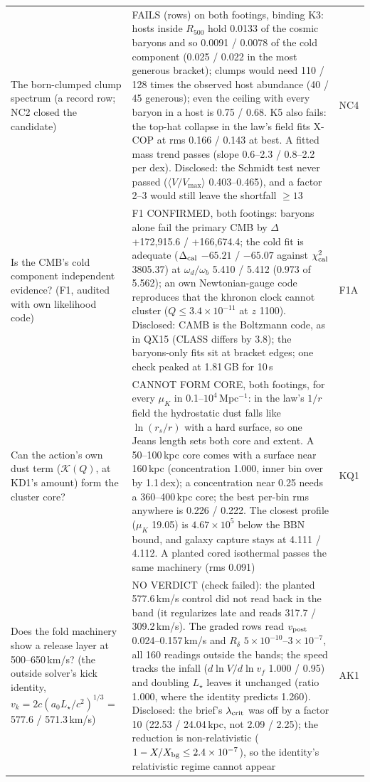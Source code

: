 \documentclass[10pt]{article}
\begin{document}
\begin{longtable}{@{}p{4.4cm}p{8.6cm}p{2.8cm}@{}}
The born-clumped clump spectrum (a record row; NC2 closed the candidate) & FAILS (rows) on both footings, binding K3: hosts inside $R_{500}$ hold 0.0133 of the cosmic baryons and so 0.0091 / 0.0078 of the cold component (0.025 / 0.022 in the most generous bracket); clumps would need 110 / 128 times the observed host abundance (40 / 45 generous); even the ceiling with every baryon in a host is 0.75 / 0.68. K5 also fails: the top-hat collapse in the law's field fits X-COP at rms 0.166 / 0.143 at best. A fitted mass trend passes (slope 0.6--2.3 / 0.8--2.2 per dex). Disclosed: the Schmidt test never passed ($\langle V/V_{\max}\rangle$ 0.403--0.465), and a factor 2--3 would still leave the shortfall $\ge13$ & NC4\\
Is the CMB's cold component independent evidence? (F1, audited with own likelihood code) & F1 CONFIRMED, both footings: baryons alone fail the primary CMB by $\Delta$ +172,915.6 / +166,674.4; the cold fit is adequate ($\Delta_{\rm cal}$ $-65.21$ / $-65.07$ against $\chi^2_{\rm cal}$ 3805.37) at $\omega_d/\omega_b$ 5.410 / 5.412 (0.973 of 5.562); an own Newtonian-gauge code reproduces that the khronon clock cannot cluster ($Q\le3.4\times10^{-11}$ at $z$ 1100). Disclosed: CAMB is the Boltzmann code, as in QX15 (CLASS differs by 3.8); the baryons-only fits sit at bracket edges; one check peaked at 1.81\,GB for 10\,s & F1A\\
Can the action's own dust term ($\mathcal K(Q)$, at KD1's amount) form the cluster core? & CANNOT FORM CORE, both footings, for every $\mu_K$ in 0.1--$10^4$\,Mpc$^{-1}$: in the law's $1/r$ field the hydrostatic dust falls like $\ln(r_s/r)$ with a hard surface, so one Jeans length sets both core and extent. A 50--100\,kpc core comes with a surface near 160\,kpc (concentration 1.000, inner bin over by 1.1\,dex); a concentration near 0.25 needs a 360--400\,kpc core; the best per-bin rms anywhere is 0.226 / 0.222. The closest profile ($\mu_K$ 19.05) is $4.67\times10^5$ below the BBN bound, and galaxy capture stays at 4.111 / 4.112. A planted cored isothermal passes the same machinery (rms 0.091) & KQ1\\
Does the fold machinery show a release layer at 500--650\,km/s? (the outside solver's kick identity, $v_k=2c(a_0L_\star/c^2)^{1/3}$ = 577.6 / 571.3\,km/s) & NO VERDICT (check failed): the planted 577.6\,km/s control did not read back in the band (it regularizes late and reads 317.7 / 309.2\,km/s). The graded rows read $v_{\rm post}$ 0.024--0.157\,km/s and $R_\delta$ $5\times10^{-10}$--$3\times10^{-7}$, all 160 readings outside the bands; the speed tracks the infall ($d\ln V/d\ln v_f$ 1.000 / 0.95) and doubling $L_\star$ leaves it unchanged (ratio 1.000, where the identity predicts 1.260). Disclosed: the brief's $\lambda_{\rm crit}$ was off by a factor 10 (22.53 / 24.04\,kpc, not 2.09 / 2.25); the reduction is non-relativistic ($1-X/X_{\rm bg}\le2.4\times10^{-7}$), so the identity's relativistic regime cannot appear & AK1\\

\end{longtable}
\end{document}
